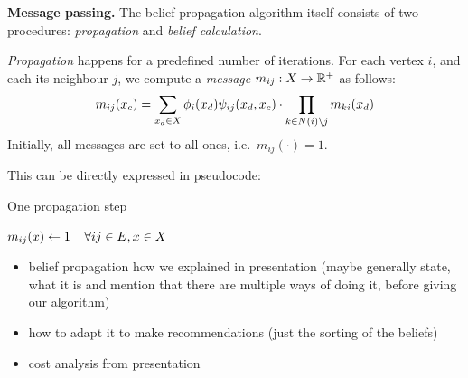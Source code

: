 \documentclass[letterpaper]{article}
\newcommand{\mypar}[1]{{\bf #1.}}
\begin{document}
\mypar{Message passing} The belief propagation algorithm itself consists of two
procedures: \emph{propagation} and \emph{belief calculation}.

\emph{Propagation} happens for a predefined number of iterations. For each vertex $i$, and each its neighbour $j$, we compute a \emph{message} $m_{ij} : X \to \mathbb{R}^+$ as follows:
%
$$m_{ij}(x_c) = \sum_{x_d \in X} \phi_i(x_d)\psi_{ij}(x_d, x_c) \cdot \prod_{k \in N(i) \setminus j} m_{ki}(x_d)$$
%
Initially, all messages are set to all-ones, i.e.~$m_{ij}(\cdot) = 1$.

This can be directly expressed in pseudocode:

\def\lineAlgoPropagateForI{4}
\def\lineAlgoPropagateCalcProduct{9}
\begin{algorithm}
\caption{One propagation step}
\label{algo:propagate}
\algodefaults
	$m_{ij}(x) \leftarrow 1\mkern 20mu\forall ij \in E, x \in X$\;
\end{algorithm}



\begin{itemize}
\item belief propagation how we explained in presentation (maybe generally state, what it is and mention that there are multiple ways of doing it, before giving our algorithm)
\item how to adapt it to make recommendations (just the sorting of the beliefs)
\item cost analysis from presentation
\end{itemize}
\end{document}

